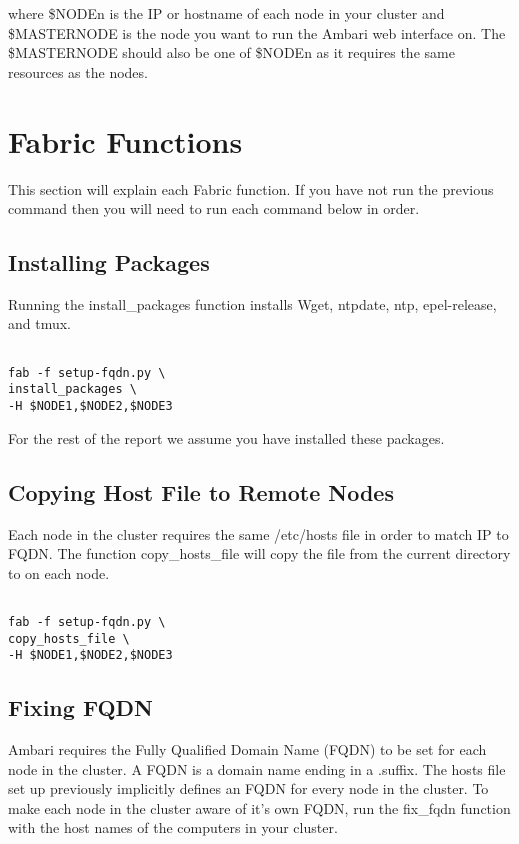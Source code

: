 \documentclass[9pt,twocolumn,twoside]{idsi}
\begin{document}
where \$NODEn is the IP or hostname of each node in your cluster and \$MASTERNODE is the node you want to run the Ambari web interface on. The \$MASTERNODE should also be one of \$NODEn as it requires the same resources as the nodes.




\section{Fabric Functions}
This section will explain each Fabric function. If you have not run the previous command then you will need to run each command below in order.

\subsection{Installing Packages}
Running the install\_packages function installs Wget, ntpdate, ntp, epel-release, and tmux.

\begin{verbatim}

fab -f setup-fqdn.py \
install_packages \
-H $NODE1,$NODE2,$NODE3

\end{verbatim}

For the rest of the report we assume you have installed these packages.

\subsection{Copying Host File to Remote Nodes}
Each node in the cluster requires the same /etc/hosts file in order to match IP to FQDN.
The function copy\_hosts\_file will copy the file  from the current directory to  on each node.


\begin{verbatim}

fab -f setup-fqdn.py \
copy_hosts_file \
-H $NODE1,$NODE2,$NODE3

\end{verbatim}


\subsection{Fixing FQDN}
Ambari requires the Fully Qualified Domain Name (FQDN) to be set for each node in the cluster. A FQDN is a domain name ending in a .suffix. The hosts file set up previously implicitly defines an FQDN for every node in the cluster. To make each node in the cluster aware of it's own FQDN, run the fix\_fqdn function with the host names of the computers in your cluster.
\end{document}
